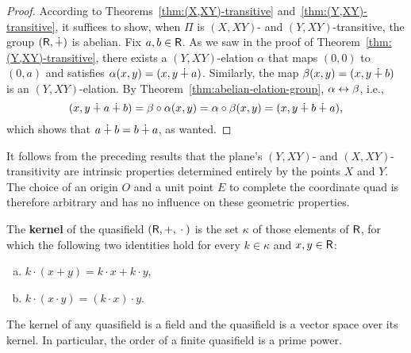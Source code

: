 \begin{proof}
    According to Theorems~\ref{thm:(X,XY)-transitive} and~\ref{thm:(Y,XY)-transitive}, it suffices to show, when $\Pi$ is $(X,XY)$- and $(Y,XY)$-transitive, the group $(\mathsf R,\dotplus)$ is abelian. Fix $a,b\in\mathsf R$. As we saw in the proof of Theorem~\ref{thm:(Y,XY)-transitive}, there exists a $(Y,XY)$-elation $\alpha$ that maps $(0,0)$ to $(0,a)$ and satisfies $\alpha(x,y)=(x,y\dotplus a)$. Similarly, the map $\beta(x,y)=(x,y\dotplus b)$ is an $(Y,XY)$-elation. By Theorem~\ref{thm:abelian-elation-group}, $\alpha\mathrel\leftrightarrow\beta$, i.e.,
    \[
        (x,y\dotplus a\dotplus b)=\beta\circ\alpha(x,y)=\alpha\circ\beta(x,y)
            = (x,y\dotplus b\dotplus a),
    \]
    which shows that $a\dotplus b=b\dotplus a$, as wanted.
\end{proof}

\begin{rem}\label{rem:O-E-independence}
    It follows from the preceding results that the plane's $(Y,XY)$- and $(X,XY)$-transitivity are intrinsic properties determined entirely by the points $X$ and $Y$. The choice of an origin $O$ and a unit point $E$ to complete the coordinate quad is therefore arbitrary and has no influence on these geometric properties.
\end{rem}

\begin{defn}
    The \textbf{kernel} of the quasifield\/ $(\mathsf R,+,{}\cdot{})$ is the set\/ $\kappa$ of those elements of\/ $\mathsf R$, for which the following two identities hold for every\/ $k\in\kappa$ and\/ $x, y \in \mathsf R$:
    \begin{enumerate}[a), font=\upshape]
        \item $k\cdot(x+y) = k\cdot x + k\cdot y$,
        \item $k\cdot(x\cdot y) = (k\cdot x)\cdot y$.
    \end{enumerate}
\end{defn}

\begin{thm}
    The kernel of any quasifield is a field and the quasifield is a vector space over its kernel. In particular, the order of a finite quasifield is a prime power.
\end{thm}


